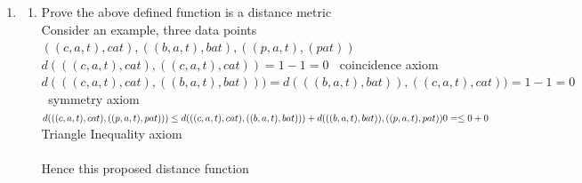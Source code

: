 \documentclass{article}
\begin{document}
\begin{enumerate}
\begin{enumerate}
\begin{enumerate}
\end{enumerate}
\end{enumerate}
\item 
\begin{enumerate}
\begin{eqnarray}
c(x) &=& \left\{\begin{array}{l} 1, \ \ \ if \: concat(set \: x) \: is \: equal \: to \: string \: x\\ 0, \ \ \ ot herwise\end{array}\right. 
\mbox{\rm }\\
d(\mathrm{\bf x},\mathrm{\bf y}) &=& c(x)-c(y) \
\end{eqnarray}
\item Prove the above defined function is a distance metric\\
Consider an example, three data points ${((c,a,t),cat),((b,a,t),bat),((p,a,t),(pat))}$\\
$d(((c,a,t),cat),((c,a,t),cat))=1-1=0$ $\:$ coincidence axiom\\
$d(((c,a,t),cat),((b,a,t),bat)))=d(((b,a,t),bat)),((c,a,t),cat))=1-1=0$ $\:$ symmetry axiom \\
$d(((c,a,t),cat),((p,a,t),pat))) \leq  d(((c,a,t),cat),((b,a,t),bat))) + d(((b,a,t),bat)),((p,a,t),pat))\\ 0 = \leq 0 + 0$ Triangle Inequality axiom \\ \\
Hence this proposed distance function 
\end{enumerate}
\end{enumerate}
\end{document}
